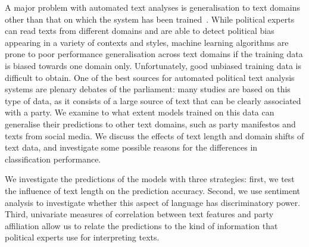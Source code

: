 \documentclass[11pt]{article}
\begin{document}
A major problem with automated text analyses is generalisation to text domains other than that on which the system has been trained~\cite{Slapin.2014}. 
While political experts can read texts from different domains and are able to detect political bias appearing in a variety of contexts and styles, machine learning algorithms are prone to poor performance generalisation across text domains if the training data is biased towards one domain only. Unfortunately, good unbiased training data is difficult to obtain. One of the best sources for automated political text analysis systems are plenary debates of the parliament: many studies are based on this type of data, as it consists of a large source of text that can be clearly associated with a party. We examine to what extent models trained on this data can generalise their predictions to other text domains, such as party manifestos and texts from social media. 
We discuss the effects of text length and domain shifts of text data, and investigate some possible reasons for the differences in classification performance. 

We investigate the predictions of the models with three strategies: first, we test the influence of text length on the prediction accuracy. Second, we use sentiment analysis to investigate whether this aspect of language has discriminatory power. Third, univariate measures of correlation between text features and party affiliation allow us to relate the predictions to the kind of information that political experts use for interpreting texts. 
\end{document}
